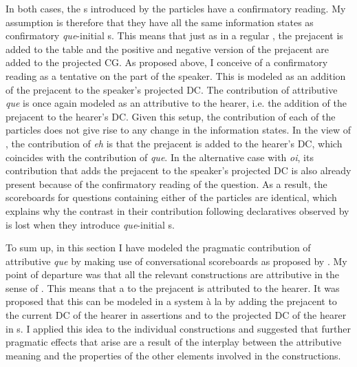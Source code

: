 In both cases, the s introduced by the particles have a confirmatory reading.  My assumption is therefore that  they have all the same information states as confirmatory \emph{que}-initial   s. This means that just as in a regular , the prejacent is added to the table and the positive and negative version of the prejacent are added to the projected CG. As proposed above, I conceive of a confirmatory reading as a tentative  on the part  of the speaker. This is modeled as an addition of the prejacent to the speaker's projected DC. The contribution of attributive  \emph{que} is once again modeled as an attributive  to the hearer, i.e. the addition of the prejacent to the hearer's DC. Given this setup, the contribution of each of the particles does not give rise to any change in the information states. In the view of \citet{Castroviejo2018}, the contribution of \emph{eh} is that the prejacent is added to the hearer's DC, which coincides with the contribution of \emph{que}. In the alternative case with \emph{oi}, its contribution that adds  the prejacent  to the speaker's projected DC is  also already present because of the confirmatory reading of the question.  As a result, the scoreboards for questions containing either of the particles are identical, which explains why the contrast in their contribution following declaratives observed by \citet{Castroviejo2018}  is lost when they introduce \emph{que}-initial s.   

To sum up, in this section I have modeled  the pragmatic contribution of attributive \emph{que} by making use of  conversational scoreboards as proposed by \citet{Malamud2015}. My point of departure was that all the relevant constructions  are attributive in the sense of \citet{Poschmann2008}. This means that a  to the prejacent is attributed to the hearer. It was proposed that this can be modeled in a system à la \citet{Malamud2015} by adding the prejacent to the current DC of the hearer in assertions and to the projected DC of the hearer in s. I applied this idea to the individual constructions and suggested that  further pragmatic effects that arise are a result of the interplay between the attributive meaning  and the properties of the other elements involved in the constructions.

